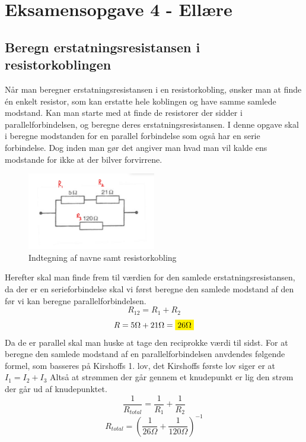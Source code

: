 \newpage
\section{Eksamensopgave 4 - Ellære}
\subsection{Beregn erstatningsresistansen i resistorkoblingen}
Når man beregner erstatningsresistansen i en resistorkobling, ønsker man at finde én enkelt resistor, som kan erstatte hele koblingen og have samme samlede modstand. Kan man starte med at finde de resistorer der sidder i parallelforbindelsen, og beregne deres erstatningsresistansen. 
I denne opgave skal i beregne modstanden for en parallel forbindelse som også har en serie forbindelse. Dog inden man gør det angiver man hvad man vil kalde ens modstande for ikke at der bilver forvirrene.\newline
\begin{figure}[h!]
    \centering
    \includegraphics[width=0.5\textwidth]{figures/resistans.png}
    \caption{Indtegning af navne samt resistorkobling}
\end{figure}
\newline
Herefter skal man finde frem til værdien for den samlede erstatningsresistansen, da der er en serieforbindelse skal vi først beregne den samlede modstand af den før vi kan beregne parallelforbindelsen.
\begin{equation*}
    R_{12}=R_{1}+R_{2}
\end{equation*}
\begin{equation*}
   R=5\Omega+21\Omega=\mathcolorbox{yellow}{26\Omega}
\end{equation*}
Da de er parallel skal man huske at tage den reciprokke værdi til sidst. For at beregne den samlede modstand af en parallelforbindelsen anvdendes følgende formel, som basseres på Kirshoffs 1. lov, det Kirshoffs første lov siger er at $I_{1} = I_2 + I_3$ Altså at strømmen der går gennem et knudepunkt er lig den strøm der går ud af knudepunktet.
\begin{equation*}
    \frac{1}{R_{total}}=\frac{1}{R_{1}}+\frac{1}{R_{2}}
\end{equation*}
\begin{equation*}
    R_{total}=\left(\frac{1}{26\Omega}+\frac{1}{120\Omega}\right)^{-1}
\end{equation*}


